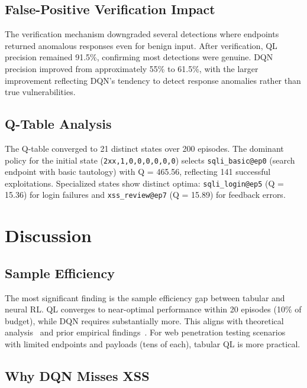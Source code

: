 \documentclass[5p,twocolumn]{elsarticle}
\begin{document}
\subsection{False-Positive Verification Impact}

The verification mechanism downgraded several detections where endpoints returned anomalous responses even for benign input. After verification, QL precision remained 91.5\%, confirming most detections were genuine. DQN precision improved from approximately 55\% to 61.5\%, with the larger improvement reflecting DQN's tendency to detect response anomalies rather than true vulnerabilities.

\subsection{Q-Table Analysis}

The Q-table converged to 21 distinct states over 200 episodes. The dominant policy for the initial state (\texttt{2xx,1,0,0,0,0,0,0}) selects \texttt{sqli\_basic@ep0} (search endpoint with basic tautology) with Q = 465.56, reflecting 141 successful exploitations. Specialized states show distinct optima: \texttt{sqli\_login@ep5} (Q = 15.36) for login failures and \texttt{xss\_review@ep7} (Q = 15.89) for feedback errors.

\section{Discussion}
\label{sec:discussion}

\subsection{Sample Efficiency}

The most significant finding is the sample efficiency gap between tabular and neural RL. QL converges to near-optimal performance within 20 episodes (10\% of budget), while DQN requires substantially more. This aligns with theoretical analysis~\cite{sutton2018} and prior empirical findings~\cite{hamidi2023}. For web penetration testing scenarios with limited endpoints and payloads (tens of each), tabular QL is more practical.

\subsection{Why DQN Misses XSS}
\end{document}
